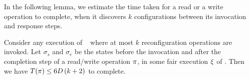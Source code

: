 In the following lemma, we estimate the time taken for a read or a write operation to complete,
	when it discovers $k$ configurations between its invocation and response steps.
%
 

\begin{lemma}
	\label{lem:rwdelay}
Consider any  execution of ~\ares{} where at most  $k$ reconfiguration operations are invoked.
Let $\sigma_s$ and $\sigma_e$ be the states before the invocation 
and after the completion step of a read/write operation $\pi$,
in some fair execution $\EX$ of \ares{}. 
Then we have 
$T(\pi)\leq 6D\left(k+2\right)$ to complete. 
\end{lemma}

